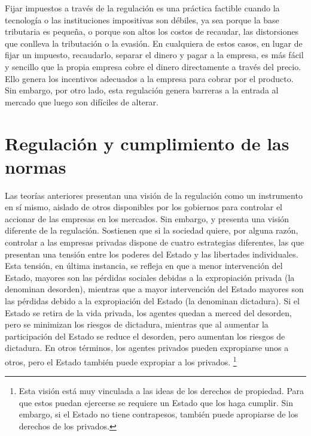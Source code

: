 \documentclass[
  12pt,
  spanish,
]{book}
\begin{document}
Fijar impuestos a través de la regulación es una práctica factible cuando la tecnología o las instituciones impositivas son débiles, ya sea porque la base tributaria es pequeña, o porque son altos los costos de recaudar, las distorsiones que conlleva la tributación o la evasión. En cualquiera de estos casos, en lugar de fijar un impuesto, recaudarlo, separar el dinero y pagar a la empresa, es más fácil y sencillo que la propia empresa cobre el dinero directamente a través del precio. Ello genera los incentivos adecuados a la empresa para cobrar por el producto. Sin embargo, por otro lado, esta regulación genera barreras a la entrada al mercado que luego son difíciles de alterar.

\hypertarget{regulaciuxf3n-y-cumplimiento-de-las-normas}{%
\section{Regulación y cumplimiento de las normas}\label{regulaciuxf3n-y-cumplimiento-de-las-normas}}

Las teorías anteriores presentan una visión de la regulación como un instrumento en sí mismo, aislado de otros disponibles por los gobiernos para controlar el accionar de las empresas en los mercados. Sin embargo, \citet{Djankov2003} y \citet{Shleifer2005} presenta una visión diferente de la regulación. Sostienen que si la sociedad quiere, por alguna razón, controlar a las empresas privadas dispone de cuatro estrategias diferentes, las que presentan una tensión entre los poderes del Estado y las libertades individuales. Esta tensión, en última instancia, se refleja en que a menor intervención del Estado, mayores son las pérdidas sociales debidas a la expropiación privada (la denominan desorden), mientras que a mayor intervención del Estado mayores son las pérdidas debido a la expropiación del Estado (la denominan dictadura). Si el Estado se retira de la vida privada, los agentes quedan a merced del desorden, pero se minimizan los riesgos de dictadura, mientras que al aumentar la participación del Estado se reduce el desorden, pero aumentan los riesgos de dictadura. En otros términos, los agentes privados pueden expropiarse unos a otros, pero el Estado también puede expropiar a los privados.
\footnote{Esta visión está muy vinculada a las ideas de los derechos de propiedad. Para que estos puedan ejercerse se requiere un Estado que los haga cumplir. Sin embargo, si el Estado no tiene contrapesos, también puede apropiarse de los derechos de los privados.}
\end{document}
